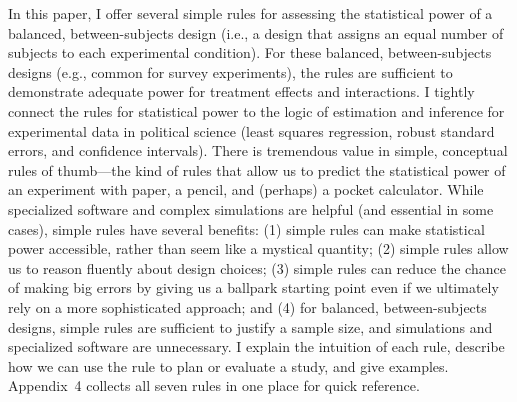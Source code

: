 \documentclass[12pt]{article}
\begin{document}
In this paper, I offer several simple rules for assessing the statistical power of a balanced, between-subjects design (i.e., a design that assigns an equal number of subjects to each experimental condition).
For these balanced, between-subjects designs (e.g., common for survey experiments), the rules are sufficient to demonstrate adequate power for treatment effects and interactions.
I tightly connect the rules for statistical power to the logic of estimation and inference for experimental data in political science (least squares regression, robust standard errors, and confidence intervals).
There is tremendous value in simple, conceptual rules of thumb---the kind of rules that allow us to predict the statistical power of an experiment with paper, a pencil, and (perhaps) a pocket calculator. %
While specialized software and complex simulations are helpful (and essential in some cases), simple rules have several benefits:
(1) simple rules can make statistical power accessible, rather than seem like a mystical quantity;
(2) simple rules allow us to reason fluently about design choices;
(3) simple rules can reduce the chance of making big errors by giving us a ballpark starting point even if we ultimately rely on a more sophisticated approach; and
(4) for balanced, between-subjects designs, simple rules are sufficient to justify a sample size, and simulations and specialized software are unnecessary.
I explain the intuition of each rule, describe how we can use the rule to plan or evaluate a study, and give examples.
Appendix~4 collects all seven rules in one place for quick reference.
\end{document}
